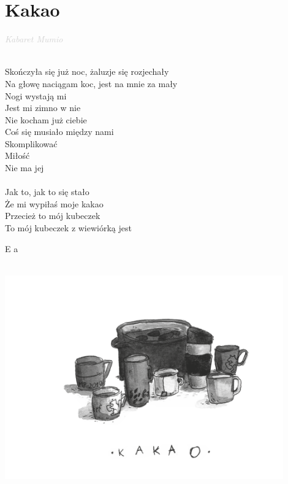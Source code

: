 \documentclass[a5paper, 10pt]{book}
\begin{document}
\section{Kakao}\textcolor{lightgray}{\textit{Kabaret Mumio}}\\~\\
\begin{minipage}[t]{0.8\textwidth}
Skończyła się już noc, żaluzje się rozjechały\\
Na głowę naciągam koc, jest na mnie za mały\\
Nogi wystają mi\\
Jest mi zimno w nie\\
Nie kocham już ciebie\\
Coś się musiało między nami\\
Skomplikować\\
Miłość\\
Nie ma jej\\
\\
\hspace*{5mm}Jak to, jak to się stało\\
\hspace*{5mm}Że mi wypiłaś moje kakao\\
\hspace*{5mm}Przecież to mój kubeczek\\
\hspace*{5mm}To mój kubeczek z wiewiórką jest\\
\end{minipage}
\begin{minipage}[t]{0.2\textwidth}
E a\\
\end{minipage}
\vspace*{2cm}\\
\includegraphics[width=0.9\textwidth, center]{images/kakao.png}\\
\end{document}
